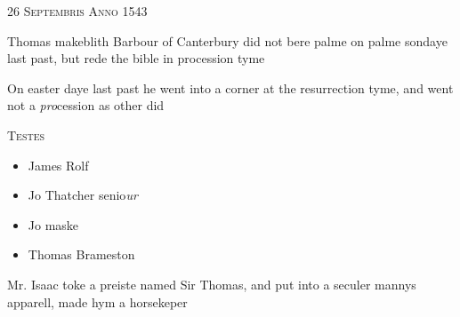 \documentclass[12pt, a4paper]{book}
\begin{document}
               
               	
				\begin{center}  {\scshape 26 Septembris Anno 1543}  \end{center}
			

               	
               		
				\marginpar[\vspace{0.5cm}{\textcolor{Gray}{Thomas makeblythe}}]{}
			
               		
				\marginpar[\vspace{0.5cm}{\textcolor{Gray}{ceremonies}}]{}
			
               		
		\ifthenelse{\isodd{\thepage}}
		{\reversemarginpar}
		{\normalmarginpar}
		Thomas makeblith Barbour of Canterbury did not
               			bere palme on palme sondaye last past, but rede
               			the bible in procession tyme
               	
               	
               		
		\ifthenelse{\isodd{\thepage}}
		{\reversemarginpar}
		{\normalmarginpar}
		On easter daye last past he went into a corner
               			at the resurrection tyme, and went not a \textit{pro}cession
               			as other did
               	
               	
               		\begin{center} {\scshape Testes} \end{center}\begin{itemize}
               			
               			\item[]James Rolf
               			\item[]Jo Thatcher senio\textit{ur}
               			\item[]Jo maske
               			\item[]Thomas Brameston
               		\end{itemize}
               	
               	
               		
				\marginpar[\vspace{0.5cm}{\textcolor{Gray}{Mr. Isaac n}}]{}
			
               		
		\ifthenelse{\isodd{\thepage}}
		{\reversemarginpar}
		{\normalmarginpar}
		Mr. Isaac toke a preiste named Sir Thomas, and put into a seculer mannys apparell, made hym a horsekeper
               	
               	
               		
\end{document}
